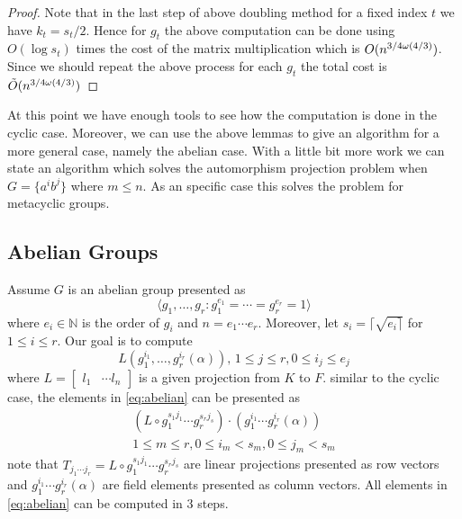 \begin{proof}
Note that in the last step of above doubling method for a fixed index $t$ we have $k_t = s_t/2$. Hence for $g_t$ the above computation can be done 
using $O(\log s_t)$ times the cost of the matrix multiplication which is $O(n^{3/4 \omega(4/3)})$. Since we should repeat the above process for each $g_t$ the total cost is
$\tilde{O}(n^{3/4 \omega(4/3)})$ 
\end{proof}


At this point we have enough tools to see how the computation is done in the cyclic case. Moreover, we can use the above lemmas
to give an algorithm for a more general case, namely the abelian case. With a little bit more work we can state an algorithm 
which solves the automorphism projection problem when $G = \lbrace a^ib^j \rbrace$ where $m \leq n$. As an specific case this
solves the problem for metacyclic groups.


\subsection{Abelian Groups}\label{ssec:proj_abelian}

Assume $G$ is an abelian group presented as 
$$ \langle g_1, \ldots , g_r: g_{1}^{e_1} = \cdots = g_{r}^{e_r} = 1 \rangle$$
 where $ e_i \in \mathbb{N}$
is the order of $g_i$ and $n = e_1 \cdots e_r$. Moreover, let $s_i = \lceil	\sqrt{e_i \rceil}$ for $ 1\leq i \leq r$.
 Our goal is to compute 
\begin{equation}\label{eq:abelian}
L (g_1^{i_1},  \ldots, g_r^{i_r}(\alpha)), \, 1 \leq j \leq r, 0 \leq i_j \leq e_j
\end{equation}
 where $L = \begin{bmatrix} l_1 & \cdots l_n \end{bmatrix}$ is a given projection from $K$ to $F$. 
similar to the cyclic case, the elements in \eqref{eq:abelian} can be presented as 
\begin{equation}
\begin{split}
(L \circ g_1^{s_1j_1} \cdots g_r^{s_rj_s})\cdot (g_1^{i_1} \cdots g_r^{i_r}(\alpha))\\ 1\leq m \leq r, 0\leq i_m < s_m, 0 \leq j_m < s_m
\end{split}
\end{equation}
note that $T_{j_1\cdots j_r} = L \circ g_1^{s_1j_1} \cdots g_r^{s_rj_s}$ are linear projections 
presented as row vectors and $g_1^{i_1} \cdots g_r^{i_r}(\alpha)$ are field elements presented as column vectors. All elements in \eqref{eq:abelian} can be computed in 3 steps.

